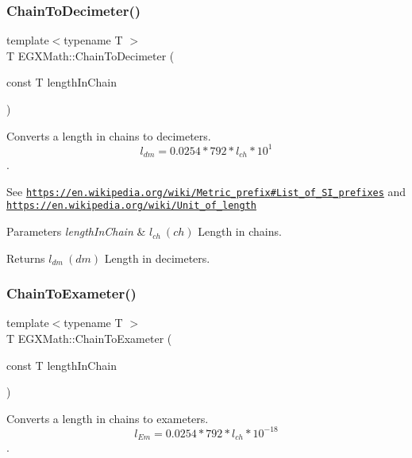 \subsubsection{\texorpdfstring{Chain\+To\+Decimeter()}{ChainToDecimeter()}}
{\footnotesize\ttfamily template$<$typename T $>$ \\
T E\+G\+X\+Math\+::\+Chain\+To\+Decimeter (\begin{DoxyParamCaption}\item[{const T}]{length\+In\+Chain }\end{DoxyParamCaption})}



Converts a length in chains to decimeters. \[ l_{dm}=0.0254 * 792 * l_{ch} * 10^{1} \]. 

See \href{https://en.wikipedia.org/wiki/Metric_prefix#List_of_SI_prefixes}{\tt https\+://en.\+wikipedia.\+org/wiki/\+Metric\+\_\+prefix\#\+List\+\_\+of\+\_\+\+S\+I\+\_\+prefixes} and \href{https://en.wikipedia.org/wiki/Unit_of_length}{\tt https\+://en.\+wikipedia.\+org/wiki/\+Unit\+\_\+of\+\_\+length} 
\begin{DoxyParams}{Parameters}
{\em length\+In\+Chain} & $ l_{ch}\ (ch)$ Length in chains. \\
\hline
\end{DoxyParams}
\begin{DoxyReturn}{Returns}
$ l_{dm}\ (dm)$ Length in decimeters. 
\end{DoxyReturn}
\mbox{\label{group___e_g_x_math-_conversions-_length_conversions-_imperial-_chain-_s_i_ga82f07f687e804faabd25839c5066792a}} 
\subsubsection{\texorpdfstring{Chain\+To\+Exameter()}{ChainToExameter()}}
{\footnotesize\ttfamily template$<$typename T $>$ \\
T E\+G\+X\+Math\+::\+Chain\+To\+Exameter (\begin{DoxyParamCaption}\item[{const T}]{length\+In\+Chain }\end{DoxyParamCaption})}



Converts a length in chains to exameters. \[ l_{Em}=0.0254 * 792 * l_{ch} * 10^{-18} \]. 


